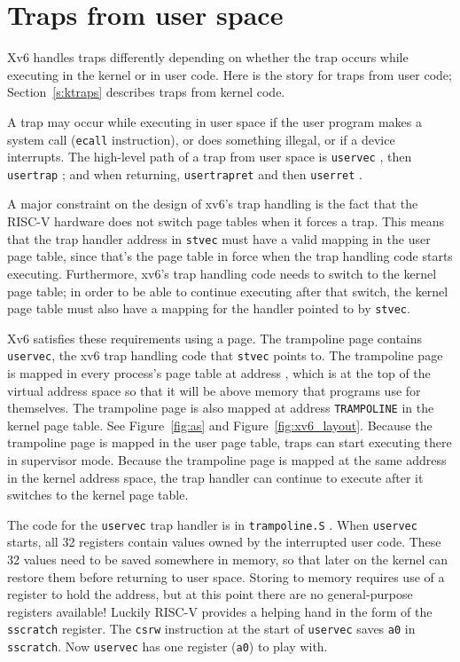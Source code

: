 \section{Traps from user space}

Xv6 handles traps differently depending on whether
the trap occurs while
executing in the kernel or in user code. Here is the
story for traps from user code; Section~\ref{s:ktraps}
describes traps from kernel code.

A trap may occur while executing in user space if the
user program makes a
system call ({\tt ecall} instruction), or does something
illegal, or if a device interrupts.
The high-level path of a trap from user space is
{\tt uservec}
,
then {\tt usertrap}
;
and when returning,
{\tt usertrapret}
and then
{\tt userret}
.


A major constraint on the design of xv6's trap handling is the fact
that the RISC-V hardware does not switch page tables when it forces a
trap. This means that the trap handler
address in {\tt stvec} must have a valid
mapping in the user page table, since that's the page table in force
when the trap handling code starts executing. Furthermore, xv6's trap
handling code needs to switch to the kernel page table; in order to be
able to continue executing after that switch, the kernel page table
must also have a mapping for the handler pointed to by {\tt stvec}.

Xv6 satisfies these requirements using a  page.
The trampoline page contains {\tt uservec}, the xv6 trap handling code
that {\tt stvec} points to. The trampoline page is mapped in
every process's page table at address
,
which is at the top of the virtual address space so that it will
be above memory that programs use for themselves.
The trampoline page is also mapped at address {\tt TRAMPOLINE}
in the kernel page table. See Figure~\ref{fig:as} and
Figure~\ref{fig:xv6_layout}. Because the trampoline page is mapped in
the user page table, traps can start
executing there in supervisor mode. Because the trampoline page is
mapped at the same address in the kernel address space, the trap handler
can continue to execute after it switches to the kernel page
table.

The code for the {\tt uservec} trap handler is in {\tt trampoline.S}
.
When {\tt uservec} starts, all 32 registers contain values owned by
the interrupted user code. These 32 values need to be saved somewhere
in memory, so that later on
the kernel can restore them before returning to user space.
Storing to memory requires use of a register
to hold the address,
but at this point there are no general-purpose registers available!
Luckily RISC-V provides a helping hand in the
form of the {\tt sscratch} register. The {\tt csrw} instruction at
the start of {\tt uservec} saves {\tt a0} in {\tt
  sscratch}. Now 
{\tt uservec} has
one register ({\tt a0}) to play with.

